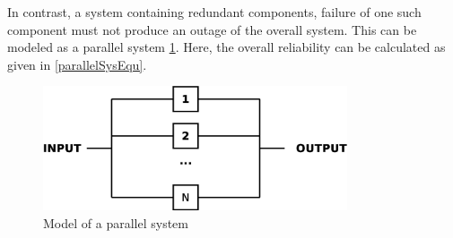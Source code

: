 In contrast, a system containing redundant components, failure of one such component must not produce an outage of the overall system. This can be modeled as
a parallel system \ref{fig:parallelSys}. Here, the overall reliability can be calculated as given in \ref{parallelSysEqu}.
\begin{figure}
    \centering
    \includegraphics[width=0.8\textwidth]{figures/parallelSys.eps}
    \caption{Model of a parallel system}
    \label{fig:parallelSys}
\end{figure}

